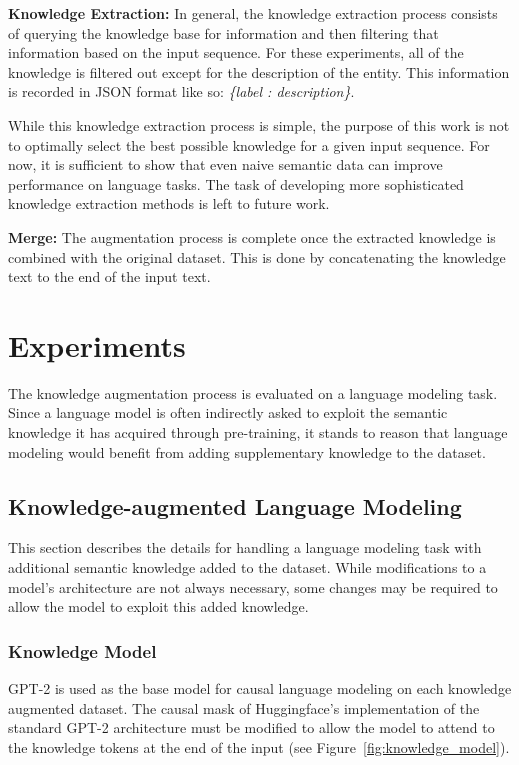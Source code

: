 \documentclass[phd,electronic,oneside,twosidetoc,letterpaper,chaptercenter,parttop,lof]{byumsphd}
\begin{document}
\textbf{Knowledge Extraction:}
In general, the knowledge extraction process consists of querying the knowledge base for information and then filtering that information based on the input sequence. 
For these experiments, all of the knowledge is filtered out except for the description of the entity. 
This information is recorded in JSON format like so: \emph{\{label : description\}}.

While this knowledge extraction process is simple, the purpose of this work is not to optimally select the best possible knowledge for a given input sequence. 
For now, it is sufficient to show that even naive semantic data can improve performance on language tasks.
The task of developing more sophisticated knowledge extraction methods is left to future work.

\textbf{Merge:}
The augmentation process is complete once the extracted knowledge is combined with the original dataset. 
This is done by concatenating the knowledge text to the end of the input text.
        
    
\section{Experiments}

The knowledge augmentation process is evaluated on a language modeling task.
Since a language model is often indirectly asked to exploit the semantic knowledge it has acquired through pre-training, it stands to reason that language modeling would benefit from adding supplementary knowledge to the dataset.

\subsection{Knowledge-augmented Language Modeling}

This section describes the details for handling a language modeling task with additional semantic knowledge added to the dataset.
While modifications to a model's architecture are not always necessary, some changes may be required to allow the model to exploit this added knowledge.

\subsubsection{Knowledge Model}

GPT-2 is used as the base model for causal language modeling on each knowledge augmented dataset. 
The causal mask of Huggingface's \cite{wolf2019huggingface} implementation of the standard GPT-2 architecture must be modified to allow the model to attend to the knowledge tokens at the end of the input (see Figure~\ref{fig:knowledge_model}).
        
\end{document}
